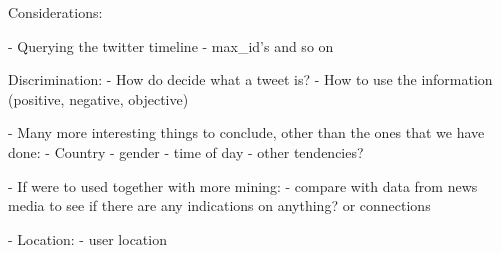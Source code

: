 \documentclass[Main]{subfiles}
\begin{document}
Considerations:



- Querying the twitter timeline
    - max_id's and so on



Discrimination:
- How do decide what a tweet is?
- How to use the information (positive, negative, objective)





- Many more interesting things to conclude, other than the ones that we have done:
    - Country
    - gender
    - time of day
    - other tendencies?
    
- If were to used together with more mining:
    - compare with data from news media to see if there are any indications on anything? or connections


- Location:
    - user location
\end{document}
